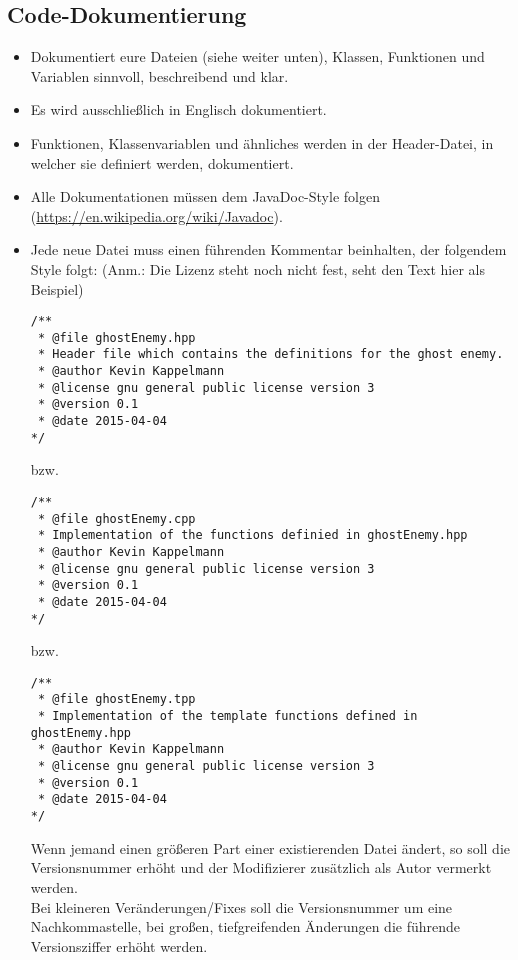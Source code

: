 \documentclass[12pt]{article}
\begin{document}
\subsection{Code-Dokumentierung}
\begin{itemize}
	\item Dokumentiert eure Dateien (siehe weiter unten), Klassen, Funktionen und Variablen sinnvoll, beschreibend und klar.
	\item Es wird ausschließlich in Englisch dokumentiert.
	\item Funktionen, Klassenvariablen und ähnliches werden in der Header-Datei, in welcher sie definiert werden, dokumentiert.
	\item Alle Dokumentationen müssen dem JavaDoc-Style folgen (\url{https://en.wikipedia.org/wiki/Javadoc}).
	\item Jede neue Datei muss einen führenden Kommentar beinhalten, der folgendem Style folgt: (Anm.: Die Lizenz steht noch nicht fest, seht den Text hier als Beispiel)
\begin{lstlisting}
/**
 * @file ghostEnemy.hpp
 * Header file which contains the definitions for the ghost enemy.
 * @author Kevin Kappelmann
 * @license gnu general public license version 3
 * @version 0.1
 * @date 2015-04-04
*/
\end{lstlisting}
bzw.
\begin{lstlisting}
/**
 * @file ghostEnemy.cpp
 * Implementation of the functions definied in ghostEnemy.hpp
 * @author Kevin Kappelmann
 * @license gnu general public license version 3
 * @version 0.1
 * @date 2015-04-04
*/
\end{lstlisting}
bzw.
\begin{lstlisting}
/**
 * @file ghostEnemy.tpp
 * Implementation of the template functions defined in ghostEnemy.hpp 
 * @author Kevin Kappelmann
 * @license gnu general public license version 3
 * @version 0.1
 * @date 2015-04-04
*/
\end{lstlisting}
Wenn jemand einen größeren Part einer existierenden Datei ändert, so soll die Versionsnummer erhöht und der Modifizierer zusätzlich als Autor vermerkt werden.\\
Bei kleineren Veränderungen/Fixes soll die Versionsnummer um eine Nachkommastelle, bei großen, tiefgreifenden Änderungen die führende Versionsziffer erhöht werden.
\end{itemize}
\end{document}
